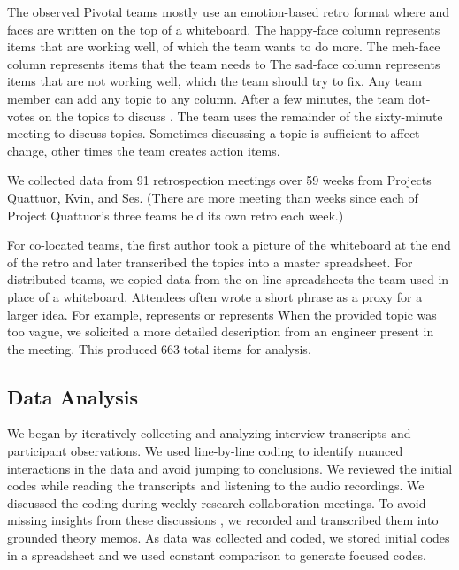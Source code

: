 The observed Pivotal teams mostly use an emotion-based retro format where   and  faces are written on the top of a whiteboard. The happy-face column represents items that are working well, of which the team wants to do more. The meh-face column represents  items that the team needs to  The sad-face column represents items that are not working well, which the team should try to fix. Any team member can add any topic to any column. After a few minutes, the team dot-votes on the topics to discuss \cite{DerbyAgileRetrospectives}. The team uses the remainder of the sixty-minute meeting to discuss topics. Sometimes discussing a topic is sufficient to affect change, other times the team creates action items. 


We collected data from 91 retrospection meetings over 59 weeks from Projects Quattuor, Kvin, and Ses. (There are more meeting than weeks since each of Project Quattuor's three teams held its own retro each week.)


For co-located teams, the first author took a picture of the whiteboard at the end of the retro and later transcribed the topics into a master spreadsheet. For distributed teams, we copied data from the on-line spreadsheets the team used in place of a whiteboard. Attendees often wrote a short phrase as a proxy for a larger idea. For example,  represents  or  represents  When the provided topic was too vague, we solicited a more detailed description from an engineer present in the meeting. This produced 663 total items for analysis. 
\subsection{Data Analysis}
We began by iteratively collecting and analyzing interview transcripts and participant observations. We used line-by-line coding \cite{Charmaz} to identify nuanced interactions in the data and avoid jumping to conclusions. We reviewed the initial codes while reading the transcripts and listening to the audio recordings. We discussed the coding during weekly research collaboration meetings. To avoid missing insights from these discussions \cite{GlaserTheoreticalSensitivity}, we recorded and transcribed them into grounded theory memos. As data was collected and coded, we stored initial codes in a spreadsheet and we used constant comparison to generate focused codes.


